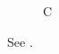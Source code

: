 \documentclass{emulateapj}
\begin{document}
\begin{figure}\caption{C}\label{f}\end{figure}
See .
\end{document}
